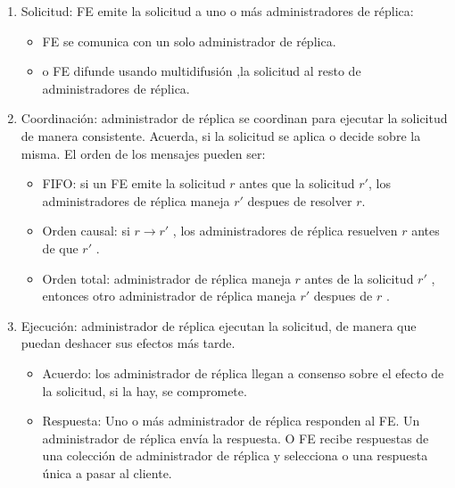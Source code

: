   \begin{enumerate} 	
 	\item Solicitud:   FE emite la solicitud a uno o más administradores de réplica:
		\begin{itemize}
			\item FE se comunica con un solo administrador de réplica.
			\item o FE  difunde usando multidifusi\'on ,la solicitud al resto de 	administradores de réplica.
		\end{itemize} 
 	\item  	Coordinación: administrador de réplica se coordinan para ejecutar la solicitud  de manera consistente.
 	Acuerda, si  la solicitud se aplica o decide sobre la misma.  El orden de los mensajes pueden ser:
 	\begin{itemize}
 		\item FIFO: si un FE emite la solicitud  $r$  antes que la solicitud $r'$, los  administradores de réplica  maneja  $r'$ despues de resolver $r$.  
 		\item Orden causal: si  $r \rightarrow r '$ , los administradores de réplica  resuelven   $r$ antes de  que $r'$ .
 		\item Orden total: administrador de réplica maneja $r$  antes de la solicitud  $r'$ , entonces otro administrador de réplica  maneja $r'$  despues  de  $r$ .
 	\end{itemize} 	
 	
 	\item Ejecución: administrador de réplica ejecutan la solicitud, de  manera que puedan deshacer sus efectos más tarde. 
 	\begin{itemize}
 		\item 	Acuerdo: los administrador de réplica llegan a consenso sobre el efecto de la solicitud, si la hay,  se compromete.  
 		\item Respuesta: Uno o más administrador de réplica responden al FE. 
 		Un administrador de réplica envía la respuesta. 
 		O FE recibe respuestas de una colección de administrador de réplica y selecciona o una respuesta única a pasar al cliente. 
 		
 	\end{itemize} 
 \end{enumerate}


   
 
